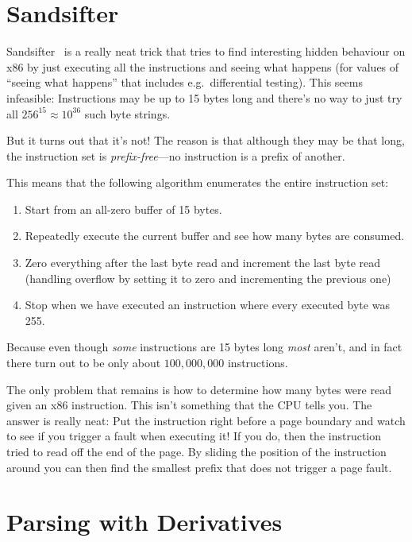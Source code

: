 \section{Sandsifter}

Sandsifter~\cite{sandsifter} is a really neat trick that tries to find interesting hidden behaviour on x86 by just executing all the instructions and seeing what happens
(for values of ``seeing what happens'' that includes e.g.\ differential testing).
This seems infeasible:
Instructions may be up to 15 bytes long and there's no way to just try all \(256^{15} \approx 10^{36}\) such byte strings.

But it turns out that it's not!
The reason is that although they may be that long,
the instruction set is \emph{prefix-free}---no
instruction is a prefix of another.

This means that the following algorithm enumerates the entire instruction set:

\begin{enumerate}
\item Start from an all-zero buffer of 15 bytes.
\item Repeatedly execute the current buffer and see how many bytes are consumed.
\item Zero everything after the last byte read and increment the last byte read (handling overflow by setting it to zero and incrementing the previous one)
\item Stop when we have executed an instruction where every executed byte was 255.
\end{enumerate}

Because even though \emph{some} instructions are 15 bytes long \emph{most} aren't,
and in fact there turn out to be only about \(100,000,000\) instructions.

The only problem that remains is how to determine how many bytes were read given an x86 instruction.
This isn't something that the CPU tells you.
The answer is really neat:
Put the instruction right before a page boundary and watch to see if you trigger a fault when executing it!
If you do, then the instruction tried to read off the end of the page.
By sliding the position of the instruction around you can then find the smallest prefix that does not trigger a page fault.

\section{Parsing with Derivatives}

